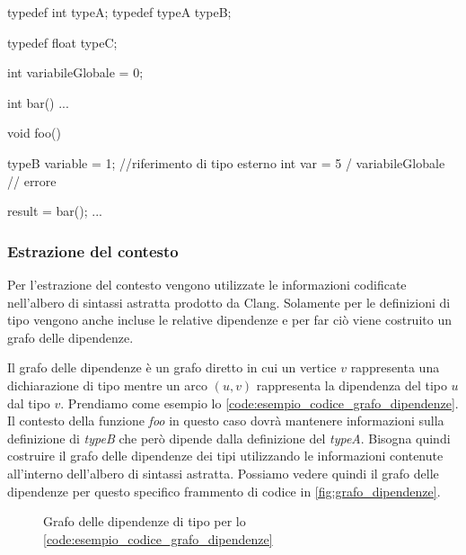 \begin{code}[language=c++, caption={Esempio di codice da cui ricavare dipendenze esterne }, label={code:esempio_codice_grafo_dipendenze}]

  typedef int typeA;
  typedef typeA typeB; 

  typedef float typeC;

  int variabileGlobale = 0;

  int bar(){
    ...
  }

  void foo(){
    typeB variable = 1; //riferimento di tipo esterno
    int var = 5 / variabileGlobale // errore
    
    result = bar();
    ...
  }

\end{code}

\subsubsection{Estrazione del contesto}\label{sec:estrazione_contesto}
Per l'estrazione del contesto vengono utilizzate le informazioni codificate nell'albero di sintassi astratta prodotto da Clang.
Solamente per le definizioni di tipo vengono anche incluse le relative dipendenze e per far ciò viene costruito un grafo delle dipendenze.

Il grafo delle dipendenze è un grafo diretto in cui un vertice $v$ rappresenta una dichiarazione di tipo mentre un arco $(u,v)$ rappresenta la dipendenza del tipo $u$ dal tipo $v$.
Prendiamo come esempio lo \autoref{code:esempio_codice_grafo_dipendenze}. 
Il contesto della funzione \textit{foo} in questo caso dovrà mantenere informazioni sulla definizione di \textit{typeB} che però dipende dalla definizione del \textit{typeA}.
Bisogna quindi costruire il grafo delle dipendenze dei tipi utilizzando le informazioni contenute all'interno dell'albero di sintassi astratta.
Possiamo vedere quindi il grafo delle dipendenze per questo specifico frammento di codice in \autoref{fig:grafo_dipendenze}.


\begin{figure}[h]
  \centering
  \caption{Grafo delle dipendenze di tipo per lo \autoref{code:esempio_codice_grafo_dipendenze}}
  \label{fig:grafo_dipendenze}
\end{figure}

